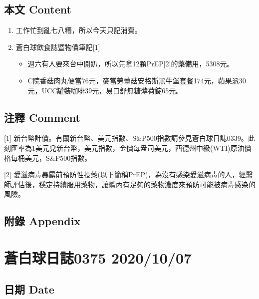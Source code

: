 \documentclass[
]{article}
\providecommand{\tightlist}{%
  \setlength{\itemsep}{0pt}\setlength{\parskip}{0pt}}
\begin{document}
\hypertarget{ux672cux6587-content-33}{%
\subsection{本文 Content}\label{ux672cux6587-content-33}}

\begin{enumerate}
\def\labelenumi{\arabic{enumi}.}
\item
  工作忙到亂七八糟，所以今天只記消費。
\item
  蒼白球飲食誌暨物價筆記{[}1{]}

  \begin{itemize}
  \tightlist
  \item
    週六有人要來台中開趴，所以先拿12顆PrEP{[}2{]}的藥備用，5308元。
  \item
    C院香菇肉丸便當76元，麥當勞蕈菇安格斯黑牛堡套餐174元，蘋果派30元，UCC罐裝咖啡39元，易口舒無糖薄荷錠65元。
  \end{itemize}
\end{enumerate}

\hypertarget{ux6ce8ux91cb-comment-33}{%
\subsection{注釋 Comment}\label{ux6ce8ux91cb-comment-33}}

{[}1{]}
新台幣計價。有關新台幣、美元指數、S\&P500指數請參見蒼白球日誌0339。此刻匯率為1美元兌新台幣，美元指數，金價每盎司美元，西德州中級(WTI)原油價格每桶美元，S\&P500指數。

{[}2{]}
愛滋病毒暴露前預防性投藥(以下簡稱PrEP)，為沒有感染愛滋病毒的人，經醫師評估後，穩定持續服用藥物，讓體內有足夠的藥物濃度來預防可能被病毒感染的風險。

\hypertarget{ux9644ux9304-appendix-33}{%
\subsection{附錄 Appendix}\label{ux9644ux9304-appendix-33}}

\hypertarget{ux84bcux767dux7403ux65e5ux8a8c0375-20201007}{%
\section{蒼白球日誌0375
2020/10/07}\label{ux84bcux767dux7403ux65e5ux8a8c0375-20201007}}

\hypertarget{ux65e5ux671f-date-34}{%
\subsection{日期 Date}\label{ux65e5ux671f-date-34}}
\end{document}
